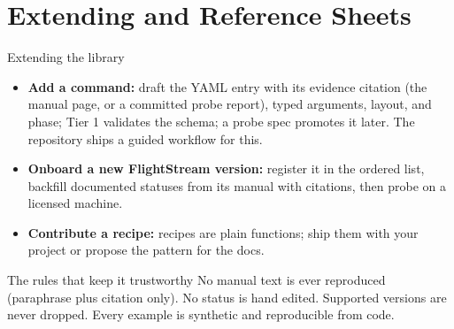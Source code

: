 \documentclass[aspectratio=169,10pt]{beamer}
\begin{document}
\section{Extending and Reference Sheets}

\begin{frame}{Extending the library}
  \begin{itemize}
    \item \textbf{Add a command:} draft the YAML entry with its evidence citation (the manual page, or a committed probe report), typed arguments, layout, and phase; Tier 1 validates the schema; a probe spec promotes it later. The repository ships a guided workflow for this.
    \item \textbf{Onboard a new FlightStream version:} register it in the ordered list, backfill documented statuses from its manual with citations, then probe on a licensed machine.
    \item \textbf{Contribute a recipe:} recipes are plain functions; ship them with your project or propose the pattern for the docs.
  \end{itemize}
  \begin{block}{The rules that keep it trustworthy}
    No manual text is ever reproduced (paraphrase plus citation only). No status is hand edited. Supported versions are never dropped. Every example is synthetic and reproducible from code.
  \end{block}
\end{frame}
\end{document}
